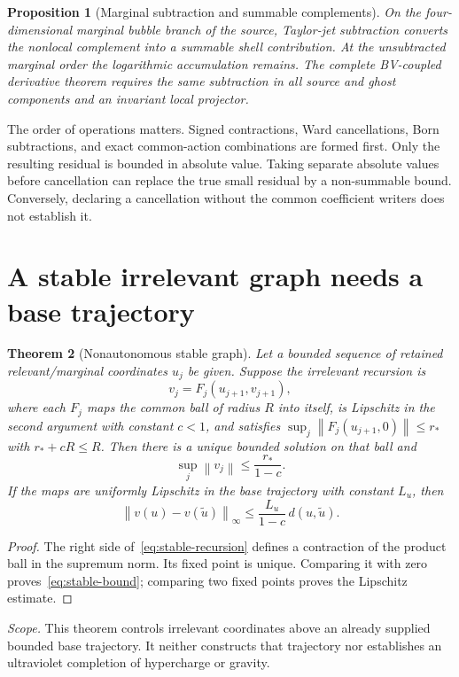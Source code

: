 \documentclass[11pt,a4paper,oneside]{book}
\theoremstyle{plain}
\newtheorem{theorem}{Theorem}[chapter]
\newtheorem{proposition}[theorem]{Proposition}
\theoremstyle{definition}
\theoremstyle{remark}
\newcommand{\norm}[1]{\left\lVert#1\right\rVert}
\newcommand{\src}[2]{\cite{#1}}
\newcommand{\scope}[1]{\par\smallskip\noindent\textit{Scope.} #1\par\smallskip}
\begin{document}
\begin{proposition}[Marginal subtraction and summable complements]
On the four-dimensional marginal bubble branch of the source, Taylor-jet subtraction converts the nonlocal complement into a summable shell contribution. At the unsubtracted marginal order the logarithmic accumulation remains. The complete BV-coupled derivative theorem requires the same subtraction in all source and ghost components and an invariant local projector.
\end{proposition}
\cite{R2,R16,R18}

The order of operations matters. Signed contractions, Ward cancellations, Born subtractions, and exact common-action combinations are formed first. Only the resulting residual is bounded in absolute value. Taking separate absolute values before cancellation can replace the true small residual by a non-summable bound. Conversely, declaring a cancellation without the common coefficient writers does not establish it.

\section{A stable irrelevant graph needs a base trajectory}
\begin{theorem}[Nonautonomous stable graph]
\label{thm:stable-graph}
Let a bounded sequence of retained relevant/marginal coordinates $u_j$ be given. Suppose the irrelevant recursion is
\begin{equation}
 v_j=F_j(u_{j+1},v_{j+1}),
 \label{eq:stable-recursion}
\end{equation}
where each $F_j$ maps the common ball of radius $R$ into itself, is Lipschitz in the second argument with constant $c<1$, and satisfies $\sup_j\norm{F_j(u_{j+1},0)}\le r_*$ with $r_*+cR\le R$. Then there is a unique bounded solution on that ball and
\begin{equation}
 \sup_j\norm{v_j}\le\frac{r_*}{1-c}.
 \label{eq:stable-bound}
\end{equation}
If the maps are uniformly Lipschitz in the base trajectory with constant $L_u$, then
\begin{equation}
 \norm{v(u)-v(\widetilde u)}_\infty
 \le\frac{L_u}{1-c}\,d(u,\widetilde u).
\end{equation}
\end{theorem}
\begin{proof}
The right side of~\eqref{eq:stable-recursion} defines a contraction of the product ball in the supremum norm. Its fixed point is unique. Comparing it with zero proves~\eqref{eq:stable-bound}; comparing two fixed points proves the Lipschitz estimate.
\end{proof}
\src{R5}{thm:v5v2-Lipschitz}
\scope{This theorem controls irrelevant coordinates above an already supplied bounded base trajectory. It neither constructs that trajectory nor establishes an ultraviolet completion of hypercharge or gravity.}
\end{document}
